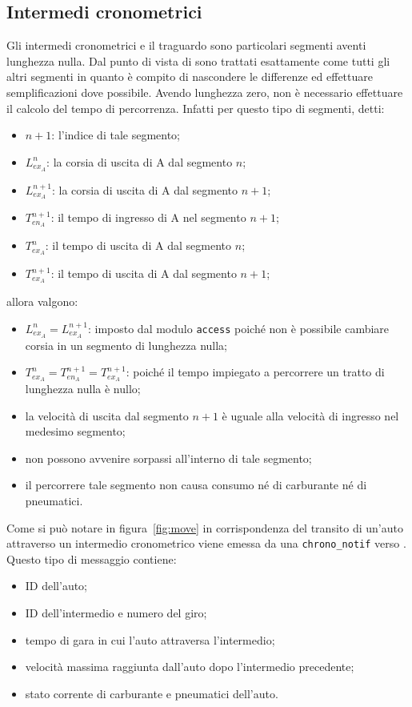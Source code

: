 \subsection{Intermedi cronometrici}
Gli intermedi cronometrici e il traguardo sono particolari segmenti aventi lunghezza nulla. Dal punto di vista di \car{} sono trattati esattamente come tutti gli altri segmenti in quanto è compito di \track{} nascondere le differenze ed effettuare semplificazioni dove possibile. Avendo lunghezza zero, non è necessario effettuare il calcolo del tempo di percorrenza. Infatti per questo tipo di segmenti, detti:
\begin{itemize}
\item $n+1$: l'indice di tale segmento;
\item $L_{ex_A}^{n}$: la corsia di uscita di A dal segmento $n$;
\item $L_{ex_A}^{n+1}$: la corsia di uscita di A dal segmento $n+1$;
\item $T_{en_A}^{n+1}$: il tempo di ingresso di A nel segmento $n+1$;
\item $T_{ex_A}^{n}$: il tempo di uscita di A dal segmento $n$;
\item $T_{ex_A}^{n+1}$: il tempo di uscita di A dal segmento $n+1$;
\end{itemize}
allora valgono:
\begin{itemize}
\item $L_{ex_A}^{n} = L_{ex_A}^{n+1}$: imposto dal modulo \texttt{access} poiché non è possibile cambiare corsia in un segmento di lunghezza nulla;
\item $T_{ex_A}^{n} = T_{en_A}^{n+1} = T_{ex_A}^{n+1}$: poiché il tempo impiegato a percorrere un tratto di lunghezza nulla è nullo;
\item la velocità di uscita dal segmento $n+1$ è uguale alla velocità di ingresso nel medesimo segmento;
\item non possono avvenire sorpassi all'interno di tale segmento;
\item il percorrere tale segmento non causa consumo né di carburante né di pneumatici.
\end{itemize}
Come si può notare in figura~\ref{fig:move} in corrispondenza del transito di un'auto attraverso un intermedio cronometrico viene emessa da \track{} una \texttt{chrono\_notif} verso \evdisp{}. Questo tipo di messaggio contiene:
\begin{itemize}
\item ID dell'auto;
\item ID dell'intermedio e numero del giro;
\item tempo di gara in cui l'auto attraversa l'intermedio;
\item velocità massima raggiunta dall'auto dopo l'intermedio precedente;
\item stato corrente di carburante e pneumatici dell'auto.
\end{itemize}


